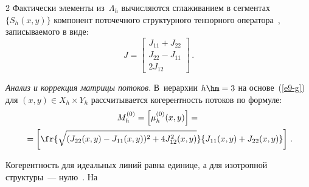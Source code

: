 \begin{multicols}{2}
  Фактически элементы из~$\Lambda_h$ вычисляются сглаживанием в 
сегментах $\{S_h(x,y)\}$ компонент поточечного структурного тензорного 
оператора~\cite{5-g}, записываемого в виде:
  \begin{equation}
  J=\begin{bmatrix}
  J_{11}+J_{22}\\
  J_{22}-J_{11}\\
  2J_{12}
  \end{bmatrix}\,.
  \label{e9-g}
  \end{equation}
  
  \textit{Анализ и коррекция матрицы потоков}. В~иерархии $h\hm=3$ на 
основе~(\ref{e9-g}) для $(x,y)\in X_h\times Y_h$ рассчитывается когерентность 
потоков по фор\-муле:
  \begin{multline}
  M_h^{(0)} =  \left[ \mu_h^{(0)}(x,y) \right] ={}\\
  {}=\left[ 
\fr{\sqrt{(J_{22}(x,y)-
J_{11}(x,y))^2+4J^2_{12}(x,y)}}{J_{11}(x,y)+J_{22}(x,y)}\right]\,.
  \label{e10-g}
  \end{multline}



  Когерентность для идеальных линий равна единице, а для изотропной 
структуры~--- нулю~\cite{5-g}. На\linebreak\vspace*{-12pt}
\pagebreak

\end{multicols}

\begin{figure} %
 \vspace*{1pt}
 \begin{center}
 \mbox{%
 \epsfxsize=161.898mm
 }
 \end{center}
 \vspace*{-9pt}
\end{figure}


